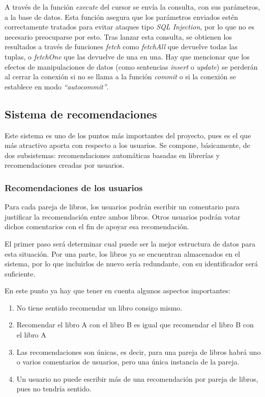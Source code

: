 A través de la función \textit{execute} del cursor se envía la consulta, con sus parámetros, a la base de datos. Esta función asegura que los parámetros enviados estén correctamente tratados para evitar ataques tipo \textit{SQL Injection}, por lo que no es necesario preocuparse por esto. Tras lanzar esta consulta, se obtienen los resultados a través de funciones \textit{fetch} como \textit{fetchAll} que devuelve todas las tuplas, o \textit{fetchOne} que las devuelve de una en una. Hay que mencionar que los efectos de manipulaciones de datos (como sentencias \textit{insert} o \textit{update}) se perderán al cerrar la conexión si no se llama a la función \textit{commit} o si la conexión se establece en modo \textit{``autocommit''}.

\subsection{Sistema de recomendaciones}

Este sistema es uno de los puntos más importantes del proyecto, pues es el que más atractivo aporta con respecto a los usuarios. Se compone, básicamente, de dos subsistemas: recomendaciones automáticas basadas en librerías y recomendaciones creadas por usuarios.

\subsubsection{Recomendaciones de los usuarios}

Para cada pareja de libros, los usuarios podrán escribir un comentario para justificar la recomendación entre ambos libros. Otros usuarios podrán votar dichos comentarios con el fin de apoyar esa recomendación.

El primer paso será determinar cual puede ser la mejor estructura de datos para esta situación. Por una parte, los libros ya se encuentran almacenados en el sistema, por lo que incluirlos de nuevo sería redundante, con su identificador será suficiente.

En este punto ya hay que tener en cuenta algunos aspectos importantes:

\begin{enumerate}
    \item No tiene sentido recomendar un libro consigo mismo.
    \item Recomendar el libro A con el libro B es igual que recomendar el libro B con el libro A
    \item Las recomendaciones son únicas, es decir, para una pareja de libros habrá uno o varios comentarios de usuarios, pero una única instancia de la pareja.
    \item Un usuario no puede escribir más de una recomendación por pareja de libros, pues no tendría sentido.
\end{enumerate}

